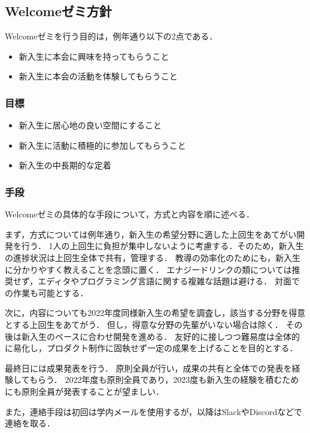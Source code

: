 \subsection*{Welcomeゼミ方針}



Welcomeゼミを行う目的は，例年通り以下の2点である．


\begin{itemize}
    \item 新入生に本会に興味を持ってもらうこと
    \item 新入生に本会の活動を体験してもらうこと
\end{itemize}


\subsubsection*{目標}
\begin{itemize}
    \item 新入生に居心地の良い空間にすること
    \item 新入生に活動に積極的に参加してもらうこと
    \item 新入生の中長期的な定着
\end{itemize}

\subsubsection*{手段}
Welcomeゼミの具体的な手段について，方式と内容を順に述べる．

まず，方式については例年通り，新入生の希望分野に適した上回生をあてがい開発を行う．
1人の上回生に負担が集中しないように考慮する．そのため，新入生の進捗状況は上回生全体で共有，管理する．
教導の効率化のためにも，新入生に分かりやすく教えることを念頭に置く．
エナジードリンクの類については推奨せず，エディタやプログラミング言語に関する複雑な話題は避ける．
対面での作業も可能とする．

次に，内容についても2022年度同様新入生の希望を調査し，該当する分野を得意とする上回生をあてがう．
但し，得意な分野の先輩がいない場合は除く．
その後は新入生のペースに合わせ開発を進める．
友好的に接しつつ難易度は全体的に易化し，プロダクト制作に固執せず一定の成果を上げることを目的とする．

最終日には成果発表を行う．
原則全員が行い，成果の共有と全体での発表を経験してもらう．
2022年度も原則全員であり，2023度も新入生の経験を積むためにも原則全員が発表することが望ましい．

また，連絡手段は初回は学内メールを使用するが，以降はSlackやDiscordなどで連絡を取る．
